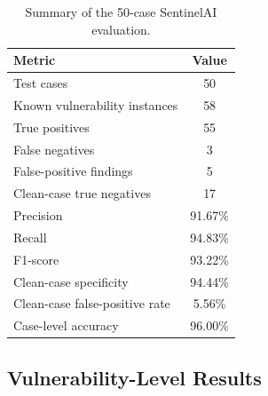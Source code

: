 \documentclass[journal]{IEEEtran}
\begin{document}
\begin{table}[!t]
\centering
\caption{Summary of the 50-case SentinelAI evaluation.}
\label{tab:50-case-metrics}
\begin{tabular}{lc}
\toprule
\textbf{Metric} & \textbf{Value} \\
\midrule
Test cases & 50 \\
Known vulnerability instances & 58 \\
True positives & 55 \\
False negatives & 3 \\
False-positive findings & 5 \\
Clean-case true negatives & 17 \\
Precision & 91.67\% \\
Recall & 94.83\% \\
F1-score & 93.22\% \\
Clean-case specificity & 94.44\% \\
Clean-case false-positive rate & 5.56\% \\
Case-level accuracy & 96.00\% \\
\bottomrule
\end{tabular}
\end{table}

\subsection{Vulnerability-Level Results}
\end{document}
